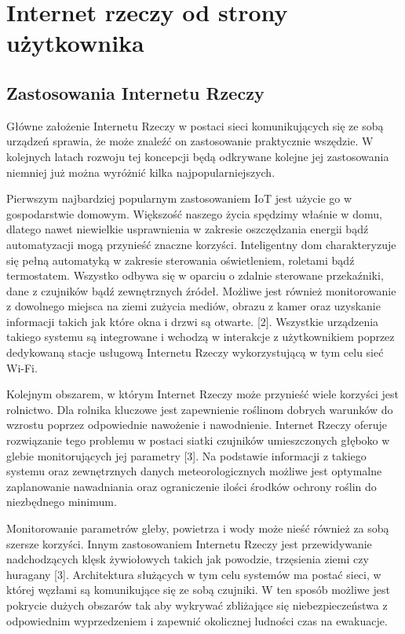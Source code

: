 \documentclass[12pt, twoside, openany]{mwrep}
\begin{document}
\chapter{Internet rzeczy od strony użytkownika}

\section{Zastosowania Internetu Rzeczy}

Główne założenie Internetu Rzeczy w postaci sieci komunikujących się ze sobą urządzeń sprawia, że może znaleźć on zastosowanie praktycznie wszędzie. W kolejnych latach rozwoju tej koncepcji będą odkrywane kolejne jej zastosowania niemniej już można wyróżnić kilka najpopularniejszych.
\par
Pierwszym najbardziej popularnym zastosowaniem IoT jest użycie go w gospodarstwie domowym.  Większość naszego życia spędzimy właśnie w domu, dlatego nawet niewielkie usprawnienia w zakresie oszczędzania energii bądź automatyzacji mogą przynieść znaczne korzyści. Inteligentny dom charakteryzuje się pełną automatyką w zakresie sterowania oświetleniem, roletami bądź termostatem. Wszystko odbywa się w oparciu o zdalnie sterowane przekaźniki, dane z czujników bądź zewnętrznych źródeł. Możliwe jest również monitorowanie z dowolnego miejsca na ziemi zużycia mediów, obrazu z kamer oraz uzyskanie informacji takich jak które okna i drzwi są otwarte. [2]. Wszystkie urządzenia takiego systemu są integrowane i wchodzą w interakcje z użytkownikiem poprzez dedykowaną stacje usługową Internetu Rzeczy wykorzystującą w tym celu sieć Wi-Fi.
\par
Kolejnym obszarem, w którym Internet Rzeczy może przynieść wiele korzyści jest rolnictwo. Dla rolnika kluczowe jest zapewnienie roślinom dobrych warunków do wzrostu poprzez odpowiednie nawożenie i nawodnienie. Internet Rzeczy oferuje rozwiązanie tego problemu w postaci siatki czujników umieszczonych głęboko w glebie monitorujących jej parametry [3]. Na podstawie informacji z takiego systemu oraz zewnętrznych danych meteorologicznych możliwe jest optymalne zaplanowanie nawadniania oraz ograniczenie ilości środków ochrony roślin do niezbędnego minimum.
\par
Monitorowanie parametrów gleby, powietrza i wody może nieść również za sobą szersze korzyści. Innym zastosowaniem Internetu Rzeczy jest przewidywanie nadchodzących klęsk żywiołowych takich jak powodzie, trzęsienia ziemi czy huragany [3]. Architektura służących w tym celu systemów ma postać sieci, w której węzłami są komunikujące się ze sobą czujniki. W ten sposób możliwe jest pokrycie dużych obszarów tak aby wykrywać zbliżające się niebezpieczeństwa z odpowiednim wyprzedzeniem i zapewnić okolicznej ludności czas na ewakuacje.
\end{document}
